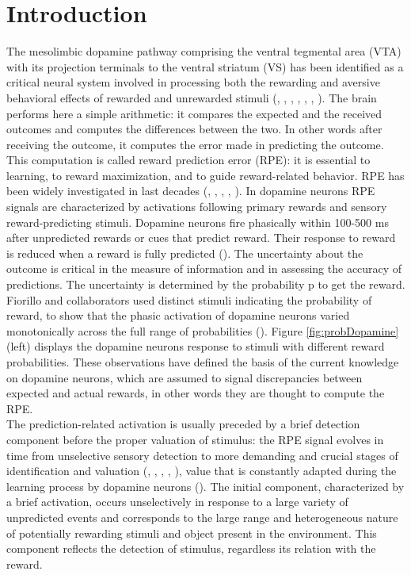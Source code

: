 \chapter{Introduction}
\label{chap:Introduction}
The mesolimbic dopamine pathway comprising the ventral tegmental area (VTA) with its projection terminals to the ventral striatum (VS) has been identified as a critical neural system involved in processing both the rewarding and aversive behavioral effects of rewarded and unrewarded stimuli (\cite{Schultz1992}, \cite{Montague}, \cite{Ungless2004}, \cite{Sun2014}, \cite{Tobler2003}, \cite{UchidaDop1}, \cite{Takahashi2016}). The brain performs here a simple arithmetic: it compares the expected and the received outcomes and computes the differences between the two. In other words after receiving the outcome, it computes the error made in predicting the outcome. This computation is called reward prediction  error (RPE): it is essential to learning, to reward maximization, and to guide reward-related behavior. RPE has been widely investigated in last decades (\cite{Schultz1997}, \cite{UchidaDop}, \cite{Fiorillo}, \cite{Pagnoni}, \cite{Schultz2016}). In dopamine neurons RPE signals are characterized by activations following primary rewards and sensory reward-predicting stimuli. Dopamine neurons fire phasically within 100-500 ms after unpredicted rewards or cues that predict reward. Their response to reward is reduced when a reward is fully predicted (\cite{Uchida}). The uncertainty about the outcome is critical in the measure of information and in assessing the accuracy of predictions. The uncertainty is determined by the probability p to get the reward.\\Fiorillo and collaborators used distinct stimuli indicating the probability of reward, to show that the phasic activation of dopamine neurons varied monotonically across the full range of probabilities (\cite{Fiorillo}). Figure \ref{fig:probDopamine} (left) displays the dopamine neurons response to stimuli with different reward probabilities. These observations have defined the basis of the current knowledge on dopamine neurons, which are assumed to signal discrepancies between expected and actual rewards, in other words they are thought to compute the RPE.\\The prediction-related activation is usually preceded by a brief detection component before the proper valuation of stimulus: the RPE signal evolves in time from unselective sensory detection to more demanding and crucial stages of identification and valuation (\cite{Tobler2003}, \cite{Nomoto2010}, \cite{Fiorillo2013}, \cite{deLafuente}, \cite{Schultz2016}), value that is constantly adapted during the learning process by dopamine neurons (\cite{Tobler2005}). The initial component, characterized by a brief activation, occurs unselectively in response to a large variety of unpredicted events and corresponds to the large range and heterogeneous nature of potentially rewarding stimuli and object present in the environment. This component reflects the detection of stimulus, regardless its relation with the reward.
